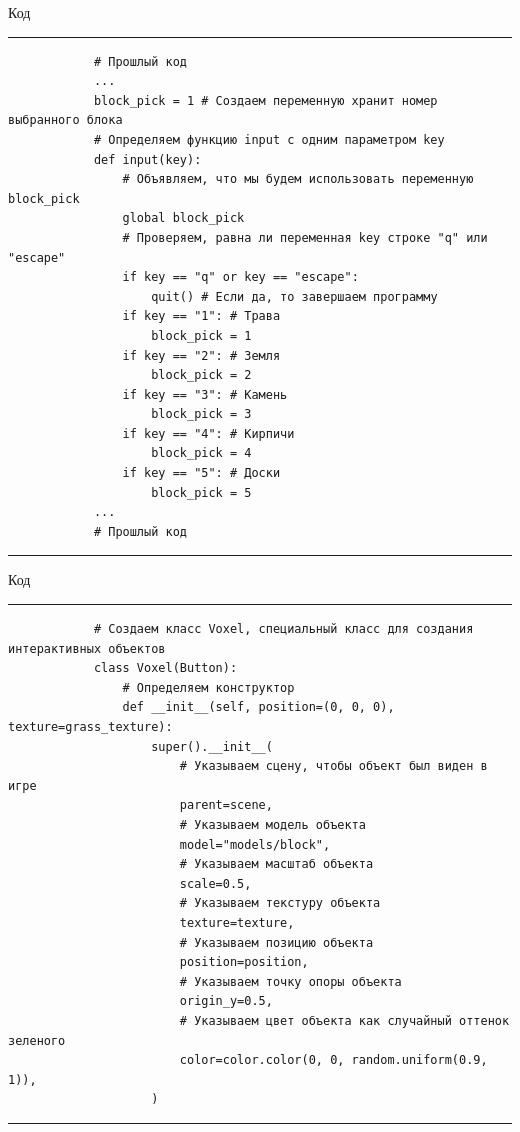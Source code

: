 \documentclass[handout]{beamer}
\begin{document}
    \begin{frame}[fragile]{Код}
        \scriptsize
        \rule{\textwidth}{1pt}
        \begin{verbatim}
            # Прошлый код
            ...
            block_pick = 1 # Создаем переменную хранит номер выбранного блока
            # Определяем функцию input с одним параметром key
            def input(key):
            	# Объявляем, что мы будем использовать переменную block_pick
            	global block_pick
            	# Проверяем, равна ли переменная key строке "q" или "escape"
            	if key == "q" or key == "escape":
            		quit() # Если да, то завершаем программу
            	if key == "1": # Трава
            		block_pick = 1
            	if key == "2": # Земля
            		block_pick = 2
            	if key == "3": # Камень
            		block_pick = 3
            	if key == "4": # Кирпичи
            		block_pick = 4
            	if key == "5": # Доски
            		block_pick = 5
            ...
            # Прошлый код
        \end{verbatim}
        \rule{\textwidth}{1pt}
    \end{frame}
    

    \begin{frame}[fragile]{Код}
        \scriptsize
        \rule{\textwidth}{1pt}
        \begin{verbatim}
            # Создаем класс Voxel, специальный класс для создания интерактивных объектов
            class Voxel(Button):
            	# Определяем конструктор
            	def __init__(self, position=(0, 0, 0), texture=grass_texture):
            		super().__init__(
            			# Указываем сцену, чтобы объект был виден в игре
            			parent=scene,
            			# Указываем модель объекта
            			model="models/block",
            			# Указываем масштаб объекта
            			scale=0.5,
            			# Указываем текстуру объекта
            			texture=texture,
            			# Указываем позицию объекта
            			position=position,
            			# Указываем точку опоры объекта
            			origin_y=0.5,
            			# Указываем цвет объекта как случайный оттенок зеленого
            			color=color.color(0, 0, random.uniform(0.9, 1)),
            		)
        \end{verbatim}
        \rule{\textwidth}{1pt}
    \end{frame}
\end{document}
